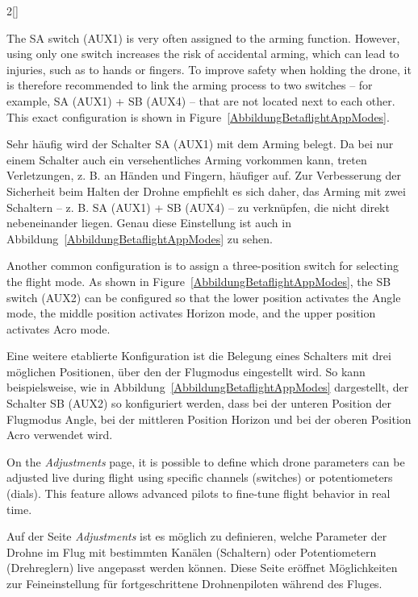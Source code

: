 \begin{paracol}{2}[]
\colstart

The SA switch (AUX1) is very often assigned to the arming function. However, using only one switch increases the risk of accidental arming, which can lead to injuries, such as to hands or fingers. To improve safety when holding the drone, it is therefore recommended to link the arming process to two switches -- for example, SA (AUX1) + SB (AUX4) -- that are not located next to each other. This exact configuration is shown in Figure~\ref{AbbildungBetaflightAppModes}.

\colger

Sehr häufig wird der Schalter SA (AUX1) mit dem Arming belegt. Da bei nur einem Schalter auch ein versehentliches Arming vorkommen kann, treten Verletzungen, z. B. an Händen und Fingern, häufiger auf. Zur Verbesserung der Sicherheit beim Halten der Drohne empfiehlt es sich daher, das Arming mit zwei Schaltern -- z. B. SA (AUX1) + SB (AUX4) -- zu verknüpfen, die nicht direkt nebeneinander liegen. Genau diese Einstellung ist auch in Abbildung~\ref{AbbildungBetaflightAppModes} zu sehen.

\coleng

Another common configuration is to assign a three-position switch for selecting the flight mode. As shown in Figure~\ref{AbbildungBetaflightAppModes}, the SB switch (AUX2) can be configured so that the lower position activates the Angle mode, the middle position activates Horizon mode, and the upper position activates Acro mode.

\colger

Eine weitere etablierte Konfiguration ist die Belegung eines Schalters mit drei möglichen Positionen, über den der Flugmodus eingestellt wird. So kann beispielsweise, wie in Abbildung~\ref{AbbildungBetaflightAppModes} dargestellt, der Schalter SB (AUX2) so konfiguriert werden, dass bei der unteren Position der Flugmodus Angle, bei der mittleren Position Horizon und bei der oberen Position Acro verwendet wird.

\coleng

On the \textsl{Adjustments} page, it is possible to define which drone parameters can be adjusted live during flight using specific channels (switches) or potentiometers (dials). This feature allows advanced pilots to fine-tune flight behavior in real time.

\colger

Auf der Seite \textsl{Adjustments} ist es möglich zu definieren, welche Parameter der Drohne im Flug mit bestimmten Kanälen (Schaltern) oder Potentiometern (Drehreglern) live angepasst werden können. Diese Seite eröffnet Möglichkeiten zur Feineinstellung für fortgeschrittene Drohnenpiloten während des Fluges.


\end{paracol}
